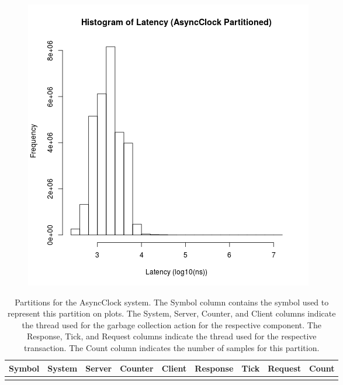 \begin{figure}
\center
\includegraphics[height=.25\textheight]{async_partitioned_latency_hist.png}
\caption{\label{async_partitioned_latency}}
\end{figure}

\clearpage

\begin{longtable}{ccccccccr}
Symbol & System & Server & Counter & Client & Response & Tick & Request & Count \\
\hline
\endhead

\caption{Partitions for the AsyncClock system.  The Symbol column contains the symbol used to represent this partition on plots.  The System, Server, Counter, and Client columns indicate the thread used for the garbage collection action for the respective component.  The Response, Tick, and Request columns indicate the thread used for the respective transaction.  The Count column indicates the number of samples for this partition.}
\label{async_partitions}
\end{longtable}

